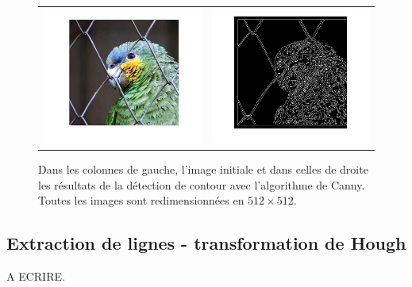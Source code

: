 \begin{figure}[ht!]
\begin{tabular}{cc}
\includegraphics[width = .5\columnwidth]{fig/parrot_rescale.png} &
\includegraphics[width = .5\columnwidth]{fig/contour_parrot.png}
\end{tabular}
\caption{Dans les colonnes de gauche, l'image initiale et dans celles de droite les résultats de la détection de contour avec l'algorithme de Canny. Toutes les images sont redimensionnées en $512\times 512$. }
\end{figure}

\subsection{Extraction de lignes - transformation de Hough}

A ECRIRE.
